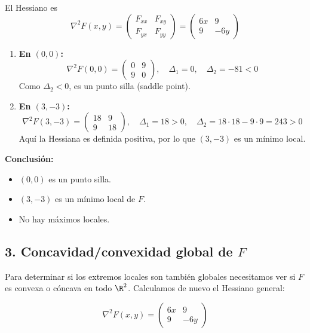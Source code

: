 \documentclass{article}
\begin{document}
El Hessiano es
\[
\nabla^2 F(x,y)
=
\begin{pmatrix}
F_{xx} & F_{xy}\\[4pt]
F_{yx} & F_{yy}
\end{pmatrix}
=
\begin{pmatrix}
6x & 9\\[4pt]
9  & -6y
\end{pmatrix}
\]

\begin{enumerate}
  \item \textbf{En \((0,0)\):}
  \[
  \nabla^2 F(0,0)
  = \begin{pmatrix}0 & 9\\[4pt]9 & 0\end{pmatrix},
  \quad \Delta_1 = 0,\quad
  \Delta_2  = -81 < 0
  \]
  Como \(\Delta_2<0\), es un punto silla (saddle point).

  \item \textbf{En \((3,-3)\):}
  \[
  \nabla^2 F(3,-3)
  = \begin{pmatrix}18 & 9\\[4pt]9 & 18\end{pmatrix},
  \quad \Delta_1 = 18 > 0,\quad
  \Delta_2 = 18\cdot18 - 9\cdot9 = 243 > 0
  \]
  Aquí la Hessiana es definida positiva, por lo que \((3,-3)\) es un mínimo local.
\end{enumerate}

\medskip

\noindent\textbf{Conclusión:}
\begin{itemize}
  \item \color{teal} \((0,0)\) es un punto silla.
  \item \color{teal} \((3,-3)\) es un mínimo local de \(F\).
  \item \color{teal} No hay máximos locales.
\end{itemize}

\subsection*{3. Concavidad/convexidad global de \(F\)}

Para determinar si los extremos locales son también globales necesitamos ver si \(F\) es convexa o cóncava en todo \(\R^2\). Calculamos de nuevo el Hessiano general:

\[
\nabla^2 F(x,y)
=
\begin{pmatrix}
6x & 9\\[4pt]
9  & -6y
\end{pmatrix}
\]
\end{document}
